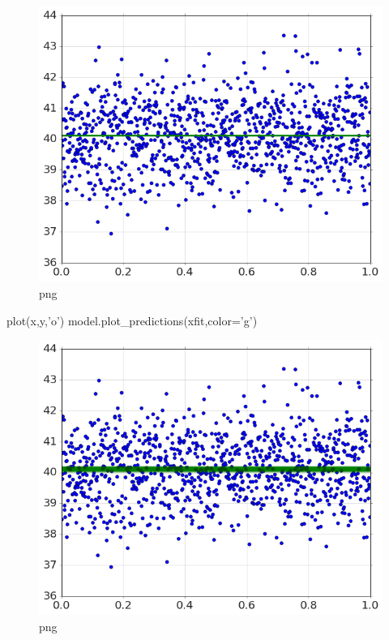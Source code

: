 \documentclass[]{article}
\newenvironment{Shaded}{}{}
\newcommand{\StringTok}[1]{\textcolor[rgb]{0.25,0.44,0.63}{{#1}}}
\newcommand{\NormalTok}[1]{{#1}}
\begin{document}
\begin{figure}[htbp]
\centering
\includegraphics{output_18_1.png}
\caption{png}
\end{figure}

\begin{Shaded}
\begin{Highlighting}[]
\NormalTok{plot(x,y,}\StringTok{'o'}\NormalTok{)}
\NormalTok{model.plot_predictions(xfit,color=}\StringTok{'g'}\NormalTok{)}
\end{Highlighting}
\end{Shaded}

\begin{figure}[htbp]
\centering
\includegraphics{output_19_0.png}
\caption{png}
\end{figure}
\end{document}
